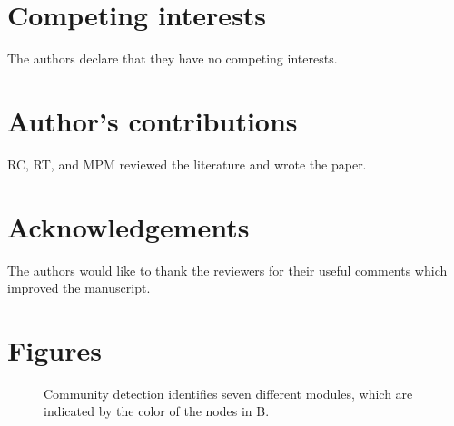 \documentclass{bmcart}
\begin{document}

\begin{backmatter}

\section*{Competing interests}
  The authors declare that they have no competing interests.

\section*{Author's contributions}
  RC, RT, and MPM reviewed the literature and wrote the paper.

\section*{Acknowledgements}
  The authors would like to thank the reviewers for their useful comments which improved the manuscript.
  
  


\section*{Figures}
  \begin{figure}[h!]
  \caption{
      Community detection identifies seven different modules, which are indicated by the color of the nodes in B.}
      \end{figure}


\end{backmatter}
\end{document}
